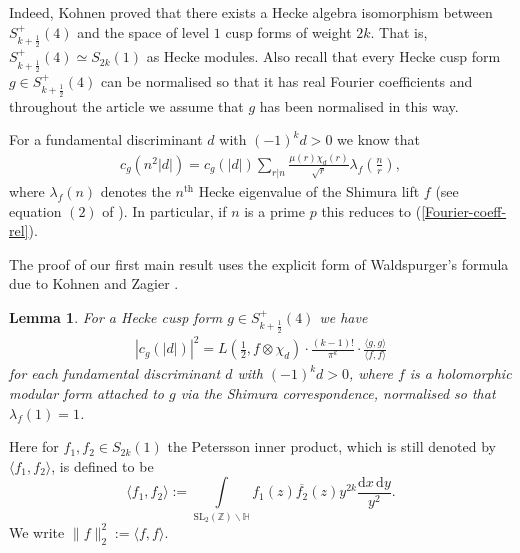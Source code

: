 \documentclass[a4paper,10pt,twoside]{amsart}
\newtheorem{lemma}[theorem]{Lemma}
\theoremstyle{definition}
\newtheorem{rem}[theorem]{Remark}
\numberwithin{equation}{section}
\renewcommand\:{\colon}
\begin{document}
Indeed, Kohnen proved \cite{Kohnen1982} that there exists a Hecke algebra isomorphism between $S^+_{k+\frac12}(4)$ and the space of level $1$ cusp forms of weight $2k$. That is, $S^+_{k+\frac12}(4)\simeq S_{2k}(1)$ as Hecke modules. Also recall that every Hecke cusp form $g\in S^+_{k+\frac12}(4)$ can be normalised so that it has real Fourier coefficients and throughout the article we assume that $g$ has been normalised in this way.

For a fundamental discriminant $d$ with $(-1)^kd>0$ we know that
\begin{align}\label{Fourier-kertoimien-yhteys}
c_g(n^2|d|)=c_g(|d|)\sum_{r|n}\frac{\mu(r)\chi_d(r)}{\sqrt r}\lambda_f\left(\frac nr\right),
\end{align}
where $\lambda_f(n)$ denotes the $n^{\text{th}}$ Hecke eigenvalue of the Shimura lift $f$ (see equation $(2)$ of \cite{Kohnen-Zagier1981}). In
particular, if $n$ is a prime $p$ this reduces to (\ref{Fourier-coeff-rel}).

The proof of our first main result uses the explicit form of Waldspurger's formula due to Kohnen and Zagier \cite{Kohnen-Zagier1981}.

\begin{lemma} 
For a Hecke cusp form $g\in S^+_{k+\frac12}(4)$ we have
\begin{align}\label{Waldspurger-rel}
|c_g(|d|)|^2=L\left(\frac12,f\otimes\chi_d\right)\cdot\frac{(k-1)!}{\pi^k}\cdot\frac{\langle g,g\rangle}{\langle f,f\rangle}
\end{align}
for each fundamental discriminant $d$ with $(-1)^kd>0$, where $f$ is a holomorphic modular form attached to $g$ via the Shimura correspondence, normalised so that $\lambda_f(1)=1$. 
\end{lemma}
Here for $f_1,f_2\in S_{2k}(1)$ the Petersson inner product, which is still denoted by $\langle f_1,f_2\rangle$, is defined to be
\[ 
\langle f_1,f_2\rangle:=\int\limits_{\mathrm{SL}_2(\mathbb Z)\backslash\mathbb H}f_1(z)\overline{f_2}(z)y^{2k}\frac{\mathrm d x\,\mathrm d y}{y^2}.\]
We write $\|f\|_2^2:=\langle f,f\rangle$.

\end{document}
